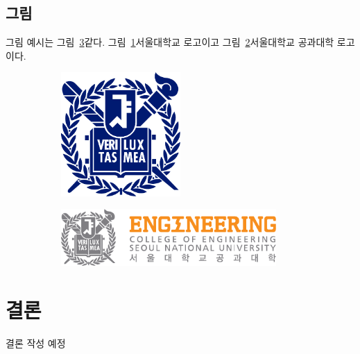\documentclass[ko]{snu-cse-bsc-thesis}
\begin{document}
\section{그림}\label{sec:picture}
그림 예시는 그림~\ref{fig:example}\와 같다. 그림~\ref{fig:snu}\은 서울대학교 로고이고 그림~\ref{fig:eng}\는 서울대학교 공과대학 로고이다.

\begin{figure}[htp]
  \centering
  \begin{subfigure}[b]{0.5\textwidth}
    \centering
    \includegraphics[width=0.5\textwidth]{logo1.pdf}
    \label{fig:snu}
  \end{subfigure}%
  \begin{subfigure}[b]{0.5\textwidth}
    \centering
    \includegraphics[width=0.9\textwidth]{logo2.pdf}
    \label{fig:eng}
  \end{subfigure}
  \label{fig:example}
\end{figure}





\chapter{결론}\label{chap:conclusion}

결론 작성 예정

\printbibliography

\begin{abstract}[en]
  영문 초록 작성 예정
\end{abstract}
\end{document}
